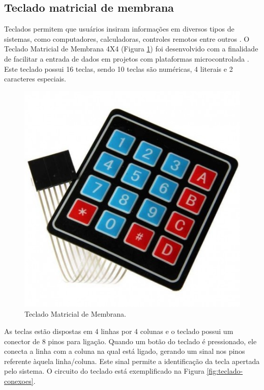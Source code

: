 \newpage

\subsection{Teclado matricial de membrana} \label{sec:teclado}

Teclados permitem que usuários insiram informações em diversos tipos de sistemas, como computadores, calculadoras, controles remotos entre outros \cite{teclado-matricial-1}. O Teclado Matricial de Membrana 4X4 (Figura \ref{fig:teclado}) foi desenvolvido com a finalidade de facilitar a entrada de dados em projetos com plataformas microcontrolada \cite{teclado-matricial}. Este teclado possui 16 teclas, sendo 10 teclas são numéricas, 4 literais e 2 caracteres especiais.

\begin{figure}[htbp]
	\centering
	\includegraphics[scale=0.2]{figuras/teclado-matricial.jpg}
	\caption{Teclado Matricial de Membrana.}
	\label{fig:teclado}
\end{figure}

As teclas estão dispostas em 4 linhas por 4 colunas e o teclado possui um conector de 8 pinos para ligação. Quando um botão do teclado é pressionado, ele conecta a linha com a coluna na qual está ligado, gerando um sinal nos pinos referente àquela linha/coluna. Este sinal permite a identificação da tecla apertada pelo sistema. O circuito do teclado está exemplificado na Figura \ref{fig:teclado-conexoes}.

